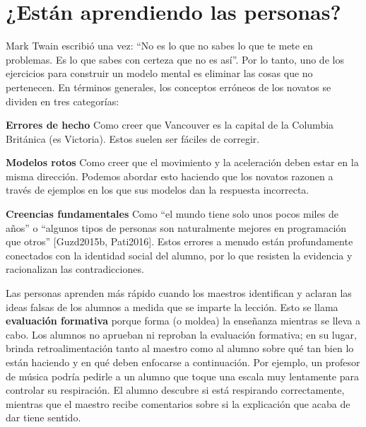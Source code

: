 \documentclass[
]{book}
\begin{document}
\hypertarget{estuxe1n-aprendiendo-las-personas}{%
\section{¿Están aprendiendo las personas?}\label{estuxe1n-aprendiendo-las-personas}}

Mark Twain escribió una vez: ``No es lo que no sabes lo que te mete en problemas. Es lo que sabes con certeza que no es así''. Por lo tanto, uno de los ejercicios para construir un modelo mental es eliminar las cosas que no pertenecen. En términos generales, los conceptos erróneos de los novatos se dividen en tres categorías:

\textbf{Errores de hecho}
Como creer que Vancouver es la capital de la Columbia Británica (es Victoria). Estos suelen ser fáciles de corregir.

\textbf{Modelos rotos}
Como creer que el movimiento y la aceleración deben estar en la misma dirección. Podemos abordar esto haciendo que los novatos razonen a través de ejemplos en los que sus modelos dan la respuesta incorrecta.

\textbf{Creencias fundamentales}
Como ``el mundo tiene solo unos pocos miles de años'' o ``algunos tipos de personas son naturalmente mejores en programación que otros'' {[}Guzd2015b, Pati2016{]}. Estos errores a menudo están profundamente conectados con la identidad social del alumno, por lo que resisten la evidencia y racionalizan las contradicciones.

Las personas aprenden más rápido cuando los maestros identifican y aclaran las ideas falsas de los alumnos a medida que se imparte la lección. Esto se llama \textbf{evaluación formativa} porque forma (o moldea) la enseñanza mientras se lleva a cabo. Los alumnos no aprueban ni reproban la evaluación formativa; en su lugar, brinda retroalimentación tanto al maestro como al alumno sobre qué tan bien lo están haciendo y en qué deben enfocarse a continuación. Por ejemplo, un profesor de música podría pedirle a un alumno que toque una escala muy lentamente para controlar su respiración. El alumno descubre si está respirando correctamente, mientras que el maestro recibe comentarios sobre si la explicación que acaba de dar tiene sentido.
\end{document}
